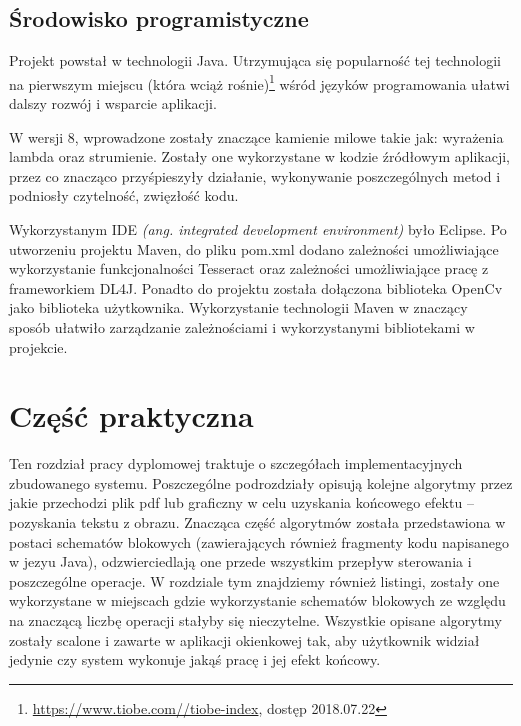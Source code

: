 \documentclass[a4paper,12pt]{article}
\newcommand\spacingIndent{2.2em}
\begin{document}
	\subsection{Środowisko programistyczne}
		\hspace{\spacingIndent} Projekt powstał w technologii Java. Utrzymująca się popularność tej technologii na pierwszym miejscu 
			(która wciąż rośnie)\footnote{\href{https://www.tiobe.com//tiobe-index}{\url{https://www.tiobe.com//tiobe-index}}, dostęp 2018.07.22} 
			wśród języków programowania ułatwi dalszy rozwój i wsparcie aplikacji. 
		
		 W wersji 8, wprowadzone zostały znaczące kamienie milowe takie jak: wyrażenia lambda oraz strumienie. Zostały one wykorzystane 
			w kodzie źródłowym aplikacji, przez co znacząco przyśpieszyły działanie, wykonywanie poszczególnych metod i podniosły czytelność, zwięzłość kodu. 
        
		Wykorzystanym IDE \textit{(ang. integrated development environment)} było Eclipse. Po utworzeniu projektu Maven, do pliku pom.xml 
			dodano zależności umożliwiające wykorzystanie funkcjonalności Tesseract oraz zależności umożliwiające pracę z frameworkiem DL4J. 
			Ponadto do projektu została dołączona biblioteka OpenCv jako biblioteka użytkownika. Wykorzystanie technologii Maven 
			w znaczący sposób ułatwiło zarządzanie zależnościami i wykorzystanymi bibliotekami w projekcie.
        \newpage
        
\section{Część praktyczna}
    \hspace{\spacingIndent} Ten rozdział pracy dyplomowej traktuje o szczegółach implementacyjnych zbudowanego systemu. Poszczególne podrozdziały opisują kolejne algorytmy przez jakie przechodzi plik pdf lub graficzny w celu uzyskania końcowego efektu -- pozyskania tekstu z obrazu. Znacząca część algorytmów została przedstawiona w postaci schematów blokowych (zawierających również fragmenty kodu napisanego w jezyu Java), odzwierciedlają one przede wszystkim przepływ sterowania i poszczególne operacje. W rozdziale tym znajdziemy również listingi, zostały one wykorzystane w miejscach gdzie wykorzystanie schematów blokowych ze względu na znaczącą liczbę operacji stałyby się nieczytelne. Wszystkie opisane algorytmy zostały scalone i zawarte w aplikacji okienkowej tak, aby użytkownik widział jedynie czy system wykonuje jakąś pracę i jej efekt końcowy.
    
\end{document}
